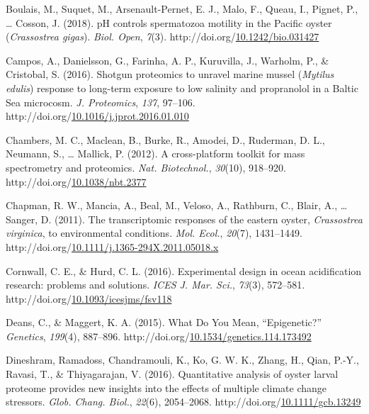 \documentclass [11pt, proquest] {uwthesis}[2015/03/03]
\newlength{\cslhangindent}
\newenvironment{CSLReferences}%
{\setlength{\parindent}{0pt}%
\everypar{\setlength{\hangindent}{\cslhangindent}}\ignorespaces}%
{\par}
\begin{document}
\begin{CSLReferences}{1}{0}
\leavevmode\hypertarget{ref-Boulais2018}{}%
Boulais, M., Suquet, M., Arsenault-Pernet, E. J., Malo, F., Queau, I., Pignet, P., \ldots{} Cosson, J. (2018). {pH controls spermatozoa motility in the Pacific oyster (\emph{Crassostrea gigas})}. \emph{Biol. Open}, \emph{7}(3). http://doi.org/\href{https://doi.org/10.1242/bio.031427}{10.1242/bio.031427}

\leavevmode\hypertarget{ref-Campos2016}{}%
Campos, A., Danielsson, G., Farinha, A. P., Kuruvilla, J., Warholm, P., \& Cristobal, S. (2016). {Shotgun proteomics to unravel marine mussel (\emph{Mytilus edulis}) response to long-term exposure to low salinity and propranolol in a Baltic Sea microcosm}. \emph{J. Proteomics}, \emph{137}, 97--106. http://doi.org/\href{https://doi.org/10.1016/j.jprot.2016.01.010}{10.1016/j.jprot.2016.01.010}

\leavevmode\hypertarget{ref-Chambers2012}{}%
Chambers, M. C., Maclean, B., Burke, R., Amodei, D., Ruderman, D. L., Neumann, S., \ldots{} Mallick, P. (2012). {A cross-platform toolkit for mass spectrometry and proteomics}. \emph{Nat. Biotechnol.}, \emph{30}(10), 918--920. http://doi.org/\href{https://doi.org/10.1038/nbt.2377}{10.1038/nbt.2377}

\leavevmode\hypertarget{ref-Chapman2011}{}%
Chapman, R. W., Mancia, A., Beal, M., Veloso, A., Rathburn, C., Blair, A., \ldots{} Sanger, D. (2011). {The transcriptomic responses of the eastern oyster, \emph{Crassostrea virginica}, to environmental conditions}. \emph{Mol. Ecol.}, \emph{20}(7), 1431--1449. http://doi.org/\href{https://doi.org/10.1111/j.1365-294X.2011.05018.x}{10.1111/j.1365-294X.2011.05018.x}

\leavevmode\hypertarget{ref-Cornwall2016}{}%
Cornwall, C. E., \& Hurd, C. L. (2016). {Experimental design in ocean acidification research: problems and solutions}. \emph{ICES J. Mar. Sci.}, \emph{73}(3), 572--581. http://doi.org/\href{https://doi.org/10.1093/icesjms/fsv118}{10.1093/icesjms/fsv118}

\leavevmode\hypertarget{ref-Deans2015}{}%
Deans, C., \& Maggert, K. A. (2015). {What Do You Mean, {``Epigenetic?''}} \emph{Genetics}, \emph{199}(4), 887--896. http://doi.org/\href{https://doi.org/10.1534/genetics.114.173492}{10.1534/genetics.114.173492}

\leavevmode\hypertarget{ref-Dineshram2016}{}%
Dineshram, Ramadoss, Chandramouli, K., Ko, G. W. K., Zhang, H., Qian, P.-Y., Ravasi, T., \& Thiyagarajan, V. (2016). {Quantitative analysis of oyster larval proteome provides new insights into the effects of multiple climate change stressors}. \emph{Glob. Chang. Biol.}, \emph{22}(6), 2054--2068. http://doi.org/\href{https://doi.org/10.1111/gcb.13249}{10.1111/gcb.13249}


\end{CSLReferences}
\end{document}

